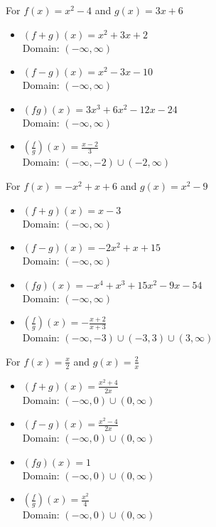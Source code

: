\begin{exenum}
\item For $f(x) = x^2-4$ and $g(x) = 3x+6$

\begin{itemize}
\item $(f+g)(x) = x^2+3x+2$ \\
      Domain: $(-\infty, \infty)$
\item $(f-g)(x) = x^2-3x-10$ \\
      Domain:  $(-\infty, \infty)$
\item $(fg)(x) = 3x^3+6x^2-12x-24$ \\
      Domain: $(-\infty, \infty)$
\item $\left(\frac{f}{g}\right)(x) = \frac{x-2}{3}$ \\
      Domain:  $\left(-\infty, -2 \right) \cup \left(-2, \infty \right)$
\end{itemize}

\item For $f(x) = -x^2+x+6$ and $g(x) = x^2-9$

\begin{itemize}
\item $(f+g)(x) = x-3$ \\
      Domain: $(-\infty, \infty)$
\item $(f-g)(x) = -2x^2+x+15$ \\
      Domain:  $(-\infty, \infty)$
\item $(fg)(x) = -x^4+x^3+15x^2-9x-54$ \\
      Domain: $(-\infty, \infty)$
\item $\left(\frac{f}{g}\right)(x) = -\frac{x+2}{x+3}$ \\
      Domain:  $\left(-\infty, -3 \right) \cup \left(-3, 3 \right) \cup (3, \infty)$
\end{itemize}


\item For  $f(x) = \frac{x}{2}$ and $g(x) = \frac{2}{x}$

\begin{itemize}
\item $(f+g)(x) = \frac{x^2+4}{2x}$ \\
      Domain: $(-\infty, 0) \cup (0, \infty)$
\item $(f-g)(x) = \frac{x^2-4}{2x}$ \\
      Domain:  $(-\infty,0) \cup (0, \infty)$
\item $(fg)(x) = 1$ \\
      Domain: $(-\infty,0) \cup (0, \infty)$
\item $\left(\frac{f}{g}\right)(x) = \frac{x^2}{4}$ \\
      Domain: $(-\infty,0) \cup (0, \infty)$
\end{itemize}


\end{exenum}
